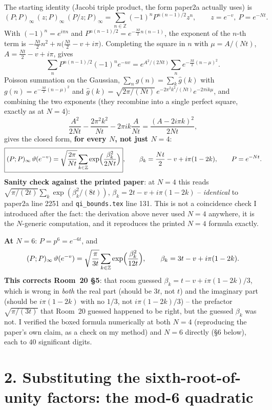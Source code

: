 \documentclass[11pt]{article}
\begin{document}
The starting identity (Jacobi triple product, the form paper2a actually uses) is
\[
  (P;P)_\infty\,(z;P)_\infty\,(P/z;P)_\infty=\sum_{n\in\mathbb Z}(-1)^nP^{n(n-1)/2}z^n,
  \qquad z=e^{-v},\ P=e^{-Nt}.
\]
With $(-1)^n=e^{i\pi n}$ and $P^{n(n-1)/2}=e^{-\frac{Nt}2n(n-1)}$, the exponent of the $n$-th
term is $-\frac{Nt}2n^2+n\bigl(\frac{Nt}2-v+i\pi\bigr)$. Completing the square in $n$ with
$\mu=A/(Nt)$, $A=\frac{Nt}2-v+i\pi$, gives
\[
  \sum_nP^{n(n-1)/2}(-1)^ne^{-nv}=e^{A^2/(2Nt)}\sum_ne^{-\frac{Nt}2(n-\mu)^2}.
\]
Poisson summation on the Gaussian, $\sum_ng(n)=\sum_k\hat g(k)$ with
$g(n)=e^{-\frac{Nt}2(n-\mu)^2}$ and $\hat g(k)=\sqrt{2\pi/(Nt)}\,e^{-2\pi^2k^2/(Nt)}e^{-2\pi
ik\mu}$, and combining the two exponents (they recombine into a single perfect square, exactly
as at $N=4$):
\[
  \frac{A^2}{2Nt}-\frac{2\pi^2k^2}{Nt}-2\pi ik\frac A{Nt}=\frac{(A-2i\pi k)^2}{2Nt},
\]
gives the closed form, \textbf{for every $N$, not just $N=4$}:
\[
  \boxed{(P;P)_\infty\,\vartheta(e^{-v})=\sqrt{\frac{2\pi}{Nt}}\sum_{k\in\mathbb Z}
  \exp\Bigl(\frac{\beta_k^2}{2Nt}\Bigr)},\qquad
  \beta_k=\frac{Nt}2-v+i\pi(1-2k),\qquad P=e^{-Nt}.
\]
\textbf{Sanity check against the printed paper}: at $N=4$ this reads
$\sqrt{\pi/(2t)}\sum_k\exp(\beta_k^2/(8t))$, $\beta_k=2t-v+i\pi(1-2k)$ -- \emph{identical} to
paper2a line 2251 and \texttt{qi\_bounds.tex} line 131. This is not a coincidence check I
introduced after the fact: the derivation above never used $N=4$ anywhere, it is the $N$-generic
computation, and it reproduces the printed $N=4$ formula exactly.

\textbf{At $N=6$}: $P=p^6=e^{-6t}$, and
\[
  (P;P)_\infty\,\vartheta(e^{-v})=\sqrt{\frac\pi{3t}}\sum_{k\in\mathbb Z}
  \exp\Bigl(\frac{\beta_k^2}{12t}\Bigr),\qquad \beta_k=3t-v+i\pi(1-2k).
\]
\textbf{This corrects Room~20 \S5}: that room guessed $\beta_k=t-v+i\pi(1-2k)/3$, which is wrong
in \emph{both} the real part (should be $3t$, not $t$) and the imaginary part (should be
$i\pi(1-2k)$ with no $1/3$, not $i\pi(1-2k)/3$) -- the prefactor $\sqrt{\pi/(3t)}$ that Room~20
guessed happened to be right, but the guessed $\beta_k$ was not. I verified the boxed formula
numerically at both $N=4$ (reproducing the paper's own claim, as a check on my method) and $N=6$
directly (\S6 below), each to $40$ significant digits.

\section*{2. Substituting the sixth-root-of-unity factors: the mod-6 quadratic}
\end{document}
